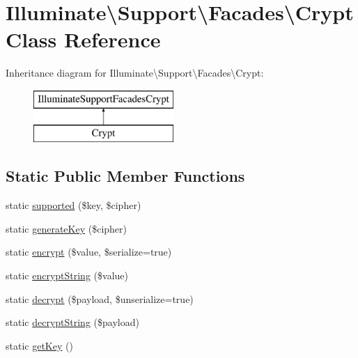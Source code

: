 \hypertarget{class_illuminate_1_1_support_1_1_facades_1_1_crypt}{}\section{Illuminate\textbackslash{}Support\textbackslash{}Facades\textbackslash{}Crypt Class Reference}
\label{class_illuminate_1_1_support_1_1_facades_1_1_crypt}
Inheritance diagram for Illuminate\textbackslash{}Support\textbackslash{}Facades\textbackslash{}Crypt\+:\begin{figure}[H]
\begin{center}
\leavevmode
\includegraphics[height=2.000000cm]{class_illuminate_1_1_support_1_1_facades_1_1_crypt}
\end{center}
\end{figure}
\subsection*{Static Public Member Functions}
\begin{DoxyCompactItemize}
\item 
static \mbox{\hyperlink{class_illuminate_1_1_support_1_1_facades_1_1_crypt_a24df7e61205c7f0732b98c430cec2822}{supported}} (\$key, \$cipher)
\item 
static \mbox{\hyperlink{class_illuminate_1_1_support_1_1_facades_1_1_crypt_a3e38bd91ea1c66bd8e37032c98a1ed9f}{generate\+Key}} (\$cipher)
\item 
static \mbox{\hyperlink{class_illuminate_1_1_support_1_1_facades_1_1_crypt_a63be1cb0c27d430f4c01ae6d813239fe}{encrypt}} (\$value, \$serialize=true)
\item 
static \mbox{\hyperlink{class_illuminate_1_1_support_1_1_facades_1_1_crypt_a643aeaa8321cb1813d37cf52b9903714}{encrypt\+String}} (\$value)
\item 
static \mbox{\hyperlink{class_illuminate_1_1_support_1_1_facades_1_1_crypt_a92aa7f25525e25d0c42cc748047b6a00}{decrypt}} (\$payload, \$unserialize=true)
\item 
static \mbox{\hyperlink{class_illuminate_1_1_support_1_1_facades_1_1_crypt_a79cb996624fa47978e78cc48b6f7536d}{decrypt\+String}} (\$payload)
\item 
static \mbox{\hyperlink{class_illuminate_1_1_support_1_1_facades_1_1_crypt_a9067fab9dcf1d9ed7d81439dcaa16a47}{get\+Key}} ()
\end{DoxyCompactItemize}


